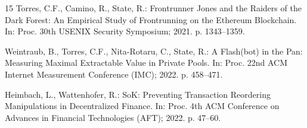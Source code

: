 \documentclass[conference]{IEEEtran}
\begin{document}
\begin{thebibliography}{15}
Torres, C.F., Camino, R., State, R.: Frontrunner Jones and the Raiders
of the Dark Forest: An Empirical Study of Frontrunning on the Ethereum
Blockchain. In: Proc. 30th USENIX Security Symposium; 2021. p.
1343--1359.

Weintraub, B., Torres, C.F., Nita-Rotaru, C., State, R.: A Flash(bot) in
the Pan: Measuring Maximal Extractable Value in Private Pools. In: Proc.
22nd ACM Internet Measurement Conference (IMC); 2022. p. 458--471.

Heimbach, L., Wattenhofer, R.: SoK: Preventing Transaction Reordering
Manipulations in Decentralized Finance. In: Proc. 4th ACM Conference on
Advances in Financial Technologies (AFT); 2022. p. 47--60.

\end{thebibliography}
\end{document}
